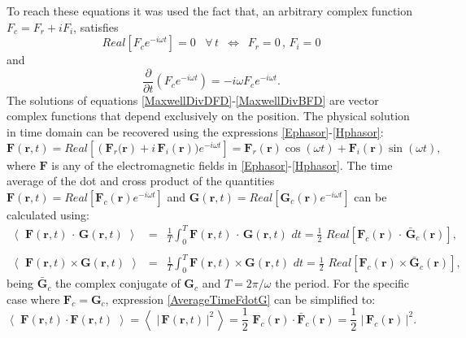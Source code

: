 To reach these equations it was used the fact that, an arbitrary complex function $F_{c} = F_{r} + iF_{i}$, satisfies
\begin{equation}
    Real\left[F_{c}e^{-i\omega t}\right] = 0 \,\,\,\,\, \forall\,t \,\,\, \Leftrightarrow \,\,\, F_{r} = 0 \, , \, F_{i} = 0\label{RealCero}
\end{equation}
and
\begin{equation}
	\frac{\partial}{\partial t}\left( F_{c}e^{-i\omega t} \right) = -i\omega F_{c}e^{-i\omega t}.\label{PhasorTDerivative}
\end{equation}
The solutions of equations \eqref{MaxwellDivDFD}-\eqref{MaxwellDivBFD} are vector complex functions that depend exclusively on the position. The physical solution in time domain can be recovered using the expressions \eqref{Ephasor}-\eqref{Hphasor}:
\begin{equation}\label{Freal}
    \textbf{F}(\textbf{r},t) = Real\left[\left(\mathbf{F}_{r}(\textbf{r}\right) + i\,\mathbf{F}_{i}(\textbf{r}))e^{-i\omega t}\right] = \mathbf{F}_{r}(\textbf{r})\cos(\omega t) + \mathbf{F}_{i}(\textbf{r})\sin(\omega t),
\end{equation}
where $\mathbf{F}$ is any of the electromagnetic fields in \eqref{Ephasor}-\eqref{Hphasor}. The time average of the dot and cross product of the quantities $\mathbf{F}(\textbf{r},t) = Real\left[\mathbf{F}_{c}(\textbf{r})e^{-i\omega t}\right]$ and $\mathbf{G}(\textbf{r},t) = Real\left[\mathbf{G}_{c}(\textbf{r})e^{-i\omega t}\right]$ can be calculated using: 
\begin{eqnarray}
    \left\langle \,\, \textbf{F}(\textbf{r},t)\,\cdot\,\textbf{G}(\textbf{r},t) \,\, \right\rangle &=& \frac{1}{T}\int^{T}_{0} \textbf{F}(\textbf{r},t)\,\cdot\,\textbf{G}(\textbf{r},t) \,\, dt = \frac{1}{2} \,\, Real\left[\textbf{F}_{c}(\textbf{r})\,\cdot\,\mathbf{\bar{G}}_{c}(\textbf{r})\right],\label{AverageTimeFdotG}
	\\\nonumber
	\\[-0.25em]
	\left\langle \,\, \textbf{F}(\textbf{r},t)\times\textbf{G}(\textbf{r},t) \,\, \right\rangle &=& \frac{1}{T}\int^{T}_{0} \textbf{F}(\textbf{r},t)\times\textbf{G}(\textbf{r},t) \,\, dt = \frac{1}{2} \,\, Real\left[\textbf{F}_{c}(\textbf{r})\times\mathbf{\bar{G}}_{c}(\textbf{r})\right],\label{AverageTimeFcrossG}
\end{eqnarray}
being $\mathbf{\bar{G}}_{c}$ the complex conjugate of $\textbf{G}_{c}$ and $T = 2\pi/\omega$ the period. For the specific case where $\textbf{F}_{c} = \textbf{G}_{c}$, expression \eqref{AverageTimeFdotG} can be simplified to:
\begin{equation}\label{AverageTimeFdotF}
    \left\langle \,\, \textbf{F}(\textbf{r},t)\cdot\textbf{F}(\textbf{r},t) \,\, \right\rangle = \left\langle \,\, |\,\textbf{F}(\textbf{r},t)\,|^{2} \, \right\rangle = \frac{1}{2} \,\, \textbf{F}_{c}(\textbf{r})\cdot\mathbf{\bar{F}}_{c}(\textbf{r}) = \frac{1}{2} \,\, |\,\textbf{F}_{c}(\textbf{r})\,|^{2}.
\end{equation}

